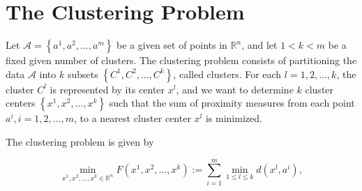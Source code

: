 \documentclass[11pt]{article}
\numberwithin{equation}{section}
\begin{document}
%
%
%
%
%
%
%
%
%
%
%
%
%
%
%
%
%
%
%
%
%

\newpage

\section{The Clustering Problem}

Let $\mathcal{A}= \left\lbrace a^1, a^2, \ldots ,a^m \right\rbrace$ be a given set of points in $\mathbb{R}^n$, and let $1 < k < m$ be a fixed given number of clusters. The clustering problem consists of partitioning the data $\mathcal{A}$ into $k$ subsets $\left\lbrace C^1, C^2, \ldots ,C^k \right\rbrace$, called clusters. For each $l=1, 2, \ldots ,k$, the cluster $C^l$ is represented by its center $x^l$, and we want to determine $k$ cluster centers $\left\lbrace x^1, x^2, \ldots ,x^k \right\rbrace$ such that the sum of proximity measures from each point $a^i, i=1, 2, \ldots ,m$, to a nearest cluster center $x^l$ is minimized.

The clustering problem is given by

\begin{equation}
	\min\limits_{x^1, x^2, \ldots ,x^k \in \mathbb{R}^n} F(x^1, x^2, \ldots ,x^k) := \sum\limits_{i=1}^{m} \min\limits_{1 \le l \le k} d(x^l,a^i) , \label{StateEq1}
\end{equation}
\end{document}

